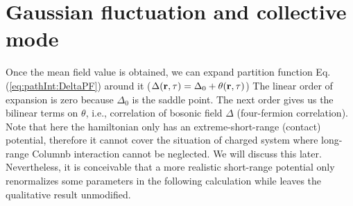 \section{Gaussian fluctuation and collective mode}\label{sec:collective1}
Once the mean field value is obtained, we can expand partition function Eq. (\ref{eq:pathInt:DeltaPF}) around it ($\Delta(\mathbf{r},\tau)=\Delta_{0}+\theta(\mathbf{r},\tau)$) The linear order of  expansion is zero because $\Delta_{0}$ is the saddle point.  The next order gives us the bilinear terms on $\theta$, i.e., correlation of bosonic field $\Delta$ (four-fermion correlation).  Note that here the hamiltonian only has an extreme-short-range (contact) potential, therefore it cannot cover the situation of charged system where long-range Columnb interaction cannot be neglected.  We will discuss this later.  Nevertheless, it is conceivable that a more realistic short-range potential only renormalizes some parameters in the following calculation while leaves the qualitative result unmodified.  

